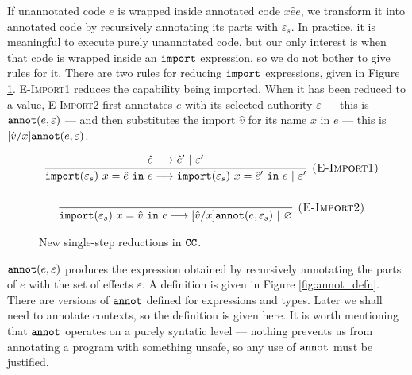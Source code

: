 If unannotated code $e$ is wrapped inside annotated code
${x}{\hat e}{e}$, we transform it into annotated
code by recursively annotating its parts with $\varepsilon_s$. In
practice, it is meaningful to execute purely unannotated code, but
our only interest is when that code is wrapped inside an
$\mathtt{import}$ expression, so we do not bother to give rules for
it. There are two rules for reducing $\mathtt{import}$
expressions, given in Figure \ref{fig:epscalc_reductions}.
\textsc{E-Import1} reduces the capability being imported. When it has been
reduced to a value, \textsc{E-Import2} first annotates $e$ with its selected
authority $\varepsilon$ --- this is $\mathtt{annot}(e, \varepsilon)$ --- and then
substitutes the import $\hat v$ for its name $x$ in $e$ --- this is
$[\hat v/x]\mathtt{annot}(e, \varepsilon)$.

\begin{figure}


\[
\begin{array}{c}
\infer[\textsc{(E-Import1)}]
	{\kwa{import}(\varepsilon_s)~x = \hat e~\kw{in} e \longrightarrow \kwa{import}(\varepsilon_s)~x = \hat e'~\kw{in} e~|~\varepsilon'}
	{\hat e \longrightarrow \hat e'~|~\varepsilon'}\\[4ex]

\infer[\textsc{(E-Import2)}]
	{\kwa{import}(\varepsilon_s)~x = \hat v~\kw{in} e \longrightarrow [\hat v/x]\kwa{annot}(e, \varepsilon_s)~|~\varnothing}
	{}

\end{array}
\]
\caption{New single-step reductions in $\mathtt{CC}$.}
\label{fig:epscalc_reductions}
\end{figure}

$\mathtt{annot}(e, \varepsilon)$ produces the expression obtained by
recursively annotating the parts of $e$ with the set of effects
$\varepsilon$. A definition is given in Figure
\ref{fig:annot_defn}. There are versions of $\mathtt{annot}$ defined for
expressions and types. Later we shall need to annotate contexts, so
the definition is given here. It is worth mentioning that
$\mathtt{annot}$ operates on a purely syntatic level --- nothing prevents
us from annotating a program with something unsafe, so any use of
$\mathtt{annot}$ must be justified.

